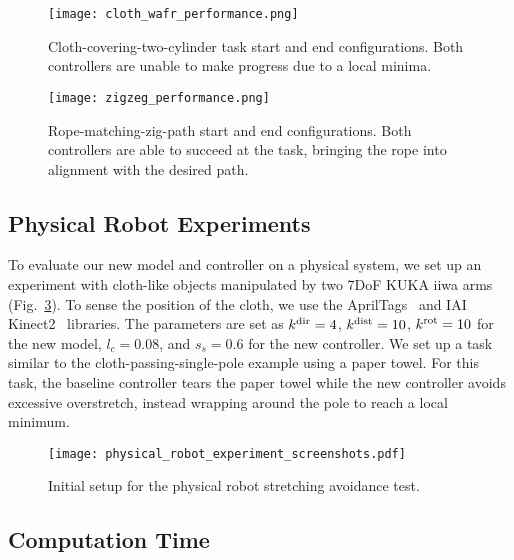 \begin{figure}[t]
    \centering
    \texttt{[image: cloth\_wafr\_performance.png]}
    \caption{Cloth-covering-two-cylinder task start and end configurations. Both controllers are unable to make progress due to a local minima.}
    \label{fig:cloth_wafr_performance}
\end{figure}


\begin{figure}[t]
    \centering
    \texttt{[image: zigzeg\_performance.png]}
    \caption{Rope-matching-zig-path start and end configurations. Both controllers are able to succeed at the task, bringing the rope into alignment with the desired path.}
    \label{fig:zigzeg_performance}
\end{figure}



\subsection{Physical Robot Experiments}

To evaluate our new model and controller on a physical system, we set up an experiment with cloth-like objects manipulated by two 7DoF KUKA iiwa arms (Fig.~\ref{fig:physical_experiment_screenshots_ctl}). To sense the position of the cloth, we use the AprilTags~\cite{olson2011tags} and IAI Kinect2~\cite{iai_kinect2} libraries. The parameters are set as $k^\textrm{dir} = 4$, $k^\textrm{dist} = 10$, $k^{\textrm{rot}} = 10$ for the new model, $l_c = 0.08$, and $s_s = 0.6$ for the new controller. We set up a task similar to the cloth-passing-single-pole example using a paper towel. For this task, the baseline controller tears the paper towel while the new controller avoids excessive overstretch, instead wrapping around the pole to reach a local minimum.

\begin{figure}[t]
    \centering
    \texttt{[image: physical\_robot\_experiment\_screenshots.pdf]}
    \caption{Initial setup for the physical robot stretching avoidance test.}
    \label{fig:physical_experiment_screenshots_ctl}
\end{figure}


\subsection{Computation Time}



